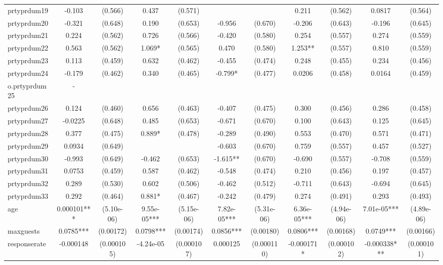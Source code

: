 \documentclass[]{article}
\begin{document}
\begin{tabular}{lcccccccccc}
prtyprdum19 & -0.103 & (0.566) & 0.437 & (0.571) &  &  & 0.211 & (0.562) & 0.0817 & (0.564) \\
prtyprdum20 & -0.321 & (0.648) & 0.190 & (0.653) & -0.956 & (0.670) & -0.206 & (0.643) & -0.196 & (0.645) \\
prtyprdum21 & 0.224 & (0.562) & 0.726 & (0.566) & -0.420 & (0.580) & 0.254 & (0.557) & 0.274 & (0.559) \\
prtyprdum22 & 0.563 & (0.562) & 1.069* & (0.565) & 0.470 & (0.580) & 1.253** & (0.557) & 0.810 & (0.559) \\
prtyprdum23 & 0.113 & (0.459) & 0.632 & (0.462) & -0.455 & (0.474) & 0.248 & (0.455) & 0.234 & (0.456) \\
prtyprdum24 & -0.179 & (0.462) & 0.340 & (0.465) & -0.799* & (0.477) & 0.0206 & (0.458) & 0.0164 & (0.459) \\
o.prtyprdum25 & - &  &  &  &  &  &  &  &  &  \\
prtyprdum26 & 0.124 & (0.460) & 0.656 & (0.463) & -0.407 & (0.475) & 0.300 & (0.456) & 0.286 & (0.458) \\
prtyprdum27 & -0.0225 & (0.648) & 0.485 & (0.653) & -0.671 & (0.670) & 0.100 & (0.643) & 0.125 & (0.645) \\
prtyprdum28 & 0.377 & (0.475) & 0.889* & (0.478) & -0.289 & (0.490) & 0.553 & (0.470) & 0.571 & (0.471) \\
prtyprdum29 & 0.0934 & (0.649) &  &  & -0.603 & (0.670) & 0.759 & (0.557) & 0.457 & (0.527) \\
prtyprdum30 & -0.993 & (0.649) & -0.462 & (0.653) & -1.615** & (0.670) & -0.690 & (0.557) & -0.708 & (0.559) \\
prtyprdum31 & 0.0753 & (0.459) & 0.587 & (0.462) & -0.548 & (0.474) & 0.210 & (0.456) & 0.197 & (0.457) \\
prtyprdum32 & 0.289 & (0.530) & 0.602 & (0.506) & -0.462 & (0.512) & -0.711 & (0.643) & -0.694 & (0.645) \\
prtyprdum33 & 0.292 & (0.464) & 0.881* & (0.467) & -0.242 & (0.479) & 0.274 & (0.491) & 0.293 & (0.493) \\
age & 0.000101*** & (5.10e-06) & 9.55e-05*** & (5.15e-06) & 7.82e-05*** & (5.31e-06) & 6.36e-05*** & (4.94e-06) & 7.01e-05*** & (4.89e-06) \\
maxguests & 0.0785*** & (0.00172) & 0.0798*** & (0.00174) & 0.0856*** & (0.00180) & 0.0806*** & (0.00168) & 0.0749*** & (0.00166) \\
responserate & -0.000148 & (0.000105) & -4.24e-05 & (0.000107) & 0.000125 & (0.000110) & -0.000171* & (0.000102) & -0.000338*** & (0.000101) \\

\end{tabular}
\end{document}
